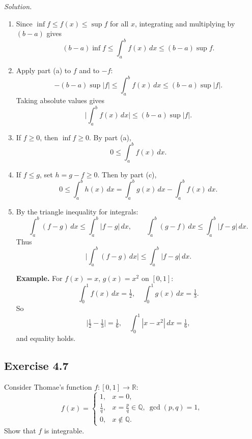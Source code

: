 \documentclass[11pt,a4paper]{article}
\newenvironment{solution}{\par\noindent\textit{Solution.}\ }{\par\vspace{0.5em}}
\begin{document}
\begin{solution}
	\begin{enumerate}[label=\alph*)]
		\item Since $\inf f \leq f(x)\leq \sup f$ for all $x$, integrating and multiplying by $(b-a)$ gives
		\[
		(b-a)\inf f \leq \int_a^b f(x)\,dx \leq (b-a)\sup f.
		\]
		
		\item Apply part (a) to $f$ and to $-f$:
		\[
		-(b-a)\sup|f|\leq \int_a^b f(x)\,dx \leq (b-a)\sup|f|.
		\]
		Taking absolute values gives
		\[
		\Big|\int_a^b f(x)\,dx\Big|\leq (b-a)\sup|f|.
		\]
		
		\item If $f\geq 0$, then $\inf f \geq 0$. By part (a),
		\[
		0\leq \int_a^b f(x)\,dx.
		\]
		
		\item If $f\leq g$, set $h=g-f\geq 0$. Then by part (c),
		\[
		0\leq \int_a^b h(x)\,dx = \int_a^b g(x)\,dx-\int_a^b f(x)\,dx.
		\]
		
		\item By the triangle inequality for integrals:
		\[
		\int_a^b (f-g)\,dx \leq \int_a^b |f-g|\,dx, \qquad
		\int_a^b (g-f)\,dx \leq \int_a^b |f-g|\,dx.
		\]
		Thus
		\[
		\Big|\int_a^b (f-g)\,dx\Big| \leq \int_a^b |f-g|\,dx.
		\]
		
		\textbf{Example.} For $f(x)=x$, $g(x)=x^2$ on $[0,1]$:
		\[
		\int_0^1 f(x)\,dx=\tfrac12, \quad \int_0^1 g(x)\,dx=\tfrac13.
		\]
		So
		\[
		\Big|\tfrac12-\tfrac13\Big|=\tfrac16, \quad \int_0^1 |x-x^2|\,dx=\tfrac16,
		\]
		and equality holds.
	\end{enumerate}
\end{solution}

\subsection*{Exercise 4.7}
Consider Thomae’s function $f:[0,1]\to\mathbb{R}$:
\[
f(x)=
\begin{cases}
	1, & x=0, \\
	\frac{1}{q}, & x=\tfrac{p}{q}\in\mathbb{Q}, \ \gcd(p,q)=1, \\
	0, & x\notin\mathbb{Q}.
\end{cases}
\]
Show that $f$ is integrable.
\end{document}
